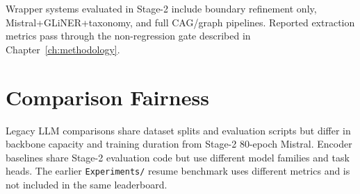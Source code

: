 Wrapper systems evaluated in Stage-2 include boundary refinement only, Mistral+GLiNER+taxonomy, and full CAG/graph pipelines.
Reported extraction metrics pass through the non-regression gate described in Chapter~\ref{ch:methodology}.

\section{Comparison Fairness}

Legacy LLM comparisons share dataset splits and evaluation scripts but differ in backbone capacity and training duration from Stage-2 80-epoch Mistral.
Encoder baselines share Stage-2 evaluation code but use different model families and task heads.
The earlier \texttt{Experiments/} resume benchmark uses different metrics and is not included in the same leaderboard.
